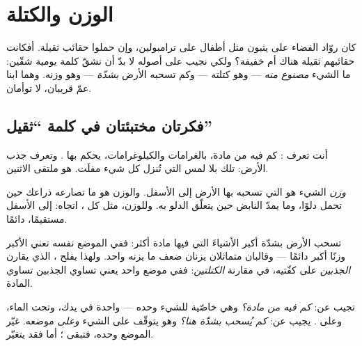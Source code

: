 \chapter{الوزن والكتلة}\label{ch:g4:weight-and-mass}

كان روّاد الفضاء على  يثبون مثل أطفال على ترامبولين، وإن
حملوا حقائب ثقيلة. أفكانت حقائبهم ثقيلة هناك أم خفيفة؟ ولكي نجيب
على أصوله لا بدّ أن نشقّ كلمة يومية شقّين: ما الشيء \emph{مصنوع
منه} --- وهو كتلته --- وكم تسحبه الأرض \emph{بشدّة} --- وهو
وزنه. وهما ابنا عمّ قريبان، لا توأمان.

\section{فكرتان مختبئتان في كلمة ``ثقيل''}

أنت تعرف : كم فيه من مادة، بالغرامات والكيلوغرامات، يحكم
بها . وتعرف جذب الأرض: تلك  بلا لمس التي تُنزل
كل شيء مفلَت.  هو ملتقى الاثنين.

\begin{definition}[الوزن]\label{def:g4:weight-and-mass:weight}
\emph{وزن} الشيء هو  التي تسحبه بها الأرض إلى
الأسفل. والوزن هو ما تصارعه ذراعك حين تحمل دلوًا، وما يمدّ
النابض حين يتعلّق الدلو به. وللوزن، مثل كل ، اتجاه: إلى
الأسفل مستقيمًا، دائمًا.
\end{definition}

\begin{proposition}\label{prop:g4:weight-and-mass:morestuff}
تسحب الأرض بشدّة أكبر الأشياءَ التي فيها مادة أكثر: ففي الموضع
نفسه تعني  الأكبر وزنًا أكبر دائمًا --- وقالبان متماثلان
يزنان ضعف ما يزنه واحد. ولهذا يفلح ، الذي يقارن
\emph{الجذبين} على كفّتيه، في مقارنة \emph{الكتلتين}: ففي موضع
واحد يعني تساوي الجذبين تساوي المادة.
\end{proposition}

\begin{example}\label{ex:g4:weight-and-mass:cousins}
 تجيب عن: \emph{كم فيه من مادة؟} وهي خاصّية للشيء وحده ---
واحدة في يدك، وتحت الماء، وعلى .  يجيب عن: \emph{كم
يُسحب بشدّة هنا؟} وهو يتوقّف على الشيء \emph{وعلى} موضعه. غيّر
الموضع وحده، فتبقى ؛ أما  فقد يتغيّر.
\end{example}

